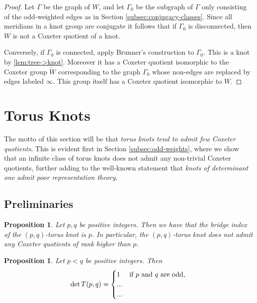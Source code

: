\documentclass{article}
\newtheorem{proposition}[theorem]{Proposition}
\theoremstyle{definition}
\begin{document}
\begin{proof}
Let $\Gamma$ be the graph of $W$, and let $\Gamma_0$ be the subgraph of $\Gamma$ only consisting of the odd-weighted edges as in Section \ref{subsec:conjugacy-classes}. Since all meridians in a knot group are conjugate it follows that if $\Gamma_0$ is disconnected, then $W$ is not a Coxeter quotient of a knot.

Conversely, if $\Gamma_0$ is connected, apply Brunner's construction to $\Gamma_0$. This is a knot by \ref{lem:tree->knot}. Moreover it has a Coxeter quotient isomorphic to the Coxeter group $\widetilde{W}$ corresponding to the graph $\Gamma_0$ whose non-edges are replaced by edges labeled $\infty$. This group itself has a Coxeter quotient isomorphic to $W$.
\end{proof}

\newpage

\section{Torus Knots}\label{sec:torus-knots}
The motto of this section will be that \textit{torus knots tend to admit few Coxeter quotients}. This is evident first in Section \ref{subsec:odd-weights}, where we show that an infinite class of torus knots does not admit any non-trivial Coxeter quotients, further adding to the well-known statement that \textit{knots of determinant one admit poor representation theory}.

\subsection{Preliminaries}
\begin{proposition}
Let $p, q$ be positive integers. Then we have that the bridge index of the $(p, q)$-torus knot is $p$. In particular, the $(p, q)$-torus knot does not admit any Coxeter quotients of rank higher than $p$.
\end{proposition}

\begin{proposition}
Let $p < q$ be positive integers. Then
$$\det T(p, q) = \begin{cases}
1 & \textup{if } p \textup{ and } q \textup { are odd,} \\
... & \\
... & \\
\end{cases} $$
\end{proposition}
\end{document}

